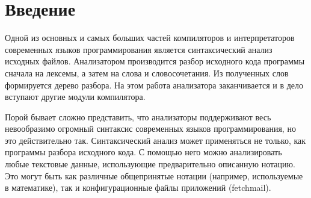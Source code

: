 
\section*{Введение}
\label{sec:intro}

Одной из основных и самых больших частей компиляторов и
интерпретаторов современных языков программирования является
синтаксический анализ исходных файлов. Анализатором производится
разбор исходного кода программы сначала на лексемы, а затем на слова и
словосочетания. Из полученных слов формируется дерево разбора. На этом
работа анализатора заканчивается и в дело вступают другие модули
компилятора.

Порой бывает сложно представить, что анализаторы поддерживают весь
невообразимо огромный синтаксис современных языков программирования,
но это действительно так.  Синтаксический анализ может применяться не
только, как программы разбора исходного кода. С помощью него можно
анализировать любые текстовые данные, использующие предварительно
описанную нотацию. Это могут быть как различные общепринятые нотации
(например, используемые в математике), так и конфигурационные файлы
приложений (fetchmail).

